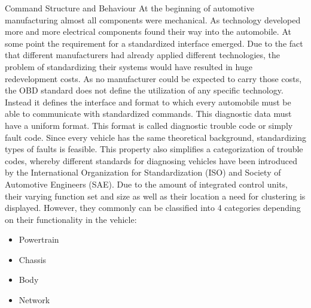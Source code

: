 Command Structure and Behaviour
At the beginning of automotive manufacturing almost all components were mechanical. As technology developed more and more electrical 
components found their way into the automobile. At some point the requirement for a standardized interface emerged. Due to the fact 
that different manufacturers had already applied different technologies, the problem of standardizing their systems would have 
resulted in huge redevelopment costs. As no manufacturer could be expected to carry those costs, the OBD standard does not define the 
utilization of any specific technology. Instead it defines the interface and format to which every automobile must be able to 
communicate with standardized commands. 
This diagnostic data must have a uniform format. This format is called diagnostic trouble code or simply fault code. Since every 
vehicle has the same theoretical background, standardizing types of faults is feasible. This property also simplifies a categorization 
of trouble codes, whereby different standards for diagnosing vehicles have been introduced by the International Organization for 
Standardization (ISO) and Society of Automotive Engineers (SAE). 
Due to the amount of integrated control units, their varying function set and size as well as their location a need for clustering is 
displayed. However, they commonly can be classified into 4 categories depending on their functionality in the vehicle:
\begin{itemize}
 \item Powertrain 
 \item Chassis 
 \item Body 
 \item Network
\end{itemize}

